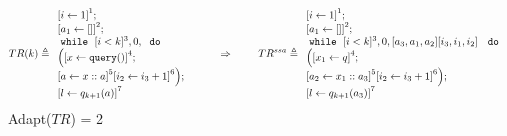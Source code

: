 \documentclass[a4paper,11pt]{article}
\begin{document}
%
\section{}

\begin{example}
\[
{
TR(k) \triangleq
{
\begin{array}{l}
    \left[i \leftarrow 1 \right]^1 ; \\
    \left[a_1 \leftarrow [] \right]^2; \\
   \ewhile ~ [i < k]^{3}, 0,     ~ \edo ~ \\
    \Big(
     \clabel{x \leftarrow \query() }^4 ; \\
    \clabel{a \leftarrow x :: a }^5  
        \left[i_2 \leftarrow i_3 + 1 \right]^6 
   \Big);\\
    \clabel{l \leftarrow q_{k + 1}(a)}^{7}\\
\end{array}
}
%
~~~~~~~~ \Rightarrow ~~~~~~~
%
TR^{ssa} \triangleq
\begin{array}{l}
    \left[i \leftarrow 1 \right]^1 ; \\
    \left[a_1 \leftarrow [] \right]^2; \\
   \ewhile ~ [i < k]^{3}, 0, 
   [ a_3,a_1,a_2 ] [ i_3,i_1,i_2 ] ~ 
    ~ \edo ~ \\
   \Big( 
     \left[x_1 \leftarrow q \right]^4; \\
    \left[a_2 \leftarrow x_1 :: a_3 \right]^5 
    \left[i_2 \leftarrow i_3 + 1 \right]^6 
    \Big);\\
    \clabel{l \leftarrow q_{k + 1}(a_3)}^{7}\\
\end{array}
}
\]
Adapt($TR$) = 2


\end{example}
\end{document}
